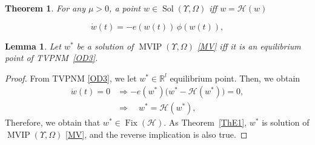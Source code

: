 \documentclass[10pt,a4paper]{amsart}
\newtheorem{theorem}{Theorem}
\newtheorem{lemma}{Lemma}
\begin{document}
\begin{theorem}\label{ThE1}
For any \(\mu> 0\), a point \(w \in\operatorname{Sol}(\Upsilon, \Omega)\)
iff  
$w=\mathcal{H}(w)$
\end{theorem}

\begin{equation}\label{OD3}
\dot{w}(t) = - e(w(t))\,\phi(w(t)),
\end{equation}

\begin{lemma}\label{Cor5.1}
Let \(w^*\) be a solution of \(\operatorname{MVIP}(\Upsilon, \Omega )\) \eqref{MV} iff it is an equilibrium point of  TVPNM~\eqref{OD3}.
\end{lemma}

\begin{proof}
From TVPNM \eqref{OD3}, we let $w^*\in \mathbb{R}^{l}$  equilibrium point. Then, we obtain 
\begin{align*}
   \dot{w}(t) = 0 
&\Rightarrow 
-e(w^*)\bigl(w^* -\mathcal{H}(w^*)\bigr) = 0, \\
&\Rightarrow \quad w^* =\mathcal{H}(w^*),
\end{align*}
Therefore, we obtain that \(w^* \in \operatorname{Fix}(\mathcal{H})\). As Theorem~\eqref{ThE1}, \(w^*\) is solution of \(\operatorname{MVIP}(\Upsilon, \Omega )\) \eqref{MV}, and the reverse implication is also true.
\end{proof}
\end{document}
